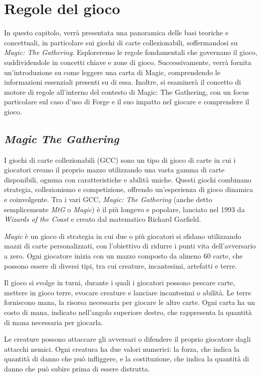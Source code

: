 \chapter{Regole del gioco}\label{chapter:background}

In questo capitolo, verrà presentata una panoramica delle basi teoriche e concettuali, in particolare sui giochi di carte collezionabili, soffermandosi su \emph{Magic: The Gathering}. Esploreremo le regole fondamentali che governano il gioco, suddividendole in concetti chiave e zone di gioco. Successivamente, verrà fornita un'introduzione su come leggere una carta di Magic, comprendendo le informazioni essenziali presenti su di essa. Inoltre, si esaminerà il concetto di motore di regole all'interno del contesto di Magic: The Gathering, con un focus particolare sul caso d'uso di Forge e il suo impatto nel giocare e comprendere il gioco.

\section{\textit{Magic The Gathering}}\label{sec:magic_the_gathering}
I giochi di carte collezionabili (GCC) sono un tipo di gioco di carte in cui i giocatori creano il proprio mazzo utilizzando una vasta gamma di carte disponibili, ognuna con caratteristiche e abilità uniche. Questi giochi combinano strategia, collezionismo e competizione, offrendo un'esperienza di gioco dinamica e coinvolgente. Tra i vari GCC, \emph{Magic: The Gathering} (anche detto semplicemente \emph{MtG} o \emph{Magic})  è il più longevo e popolare, lanciato nel 1993 da \emph{Wizards of the Coast} e creato dal matematico Richard Garfield.

\emph{Magic} è un gioco di strategia in cui due o più giocatori si sfidano utilizzando mazzi di carte personalizzati, con l'obiettivo di ridurre i punti vita dell'avversario a zero. Ogni giocatore inizia con un mazzo composto da almeno 60 carte, che possono essere di diversi tipi, tra cui creature, incantesimi, artefatti e terre.

Il gioco si svolge in turni, durante i quali i giocatori possono pescare carte, mettere in gioco terre, evocare creature e lanciare incantesimi o abilità. Le terre forniscono mana, la risorsa necessaria per giocare le altre carte. Ogni carta ha un costo di mana, indicato nell'angolo superiore destro, che rappresenta la quantità di mana necessaria per giocarla.

Le creature possono attaccare gli avversari o difendere il proprio giocatore dagli attacchi nemici. Ogni creatura ha due valori numerici: la forza, che indica la quantità di danno che può infliggere, e la costituzione, che indica la quantità di danno che può subire prima di essere distrutta.


